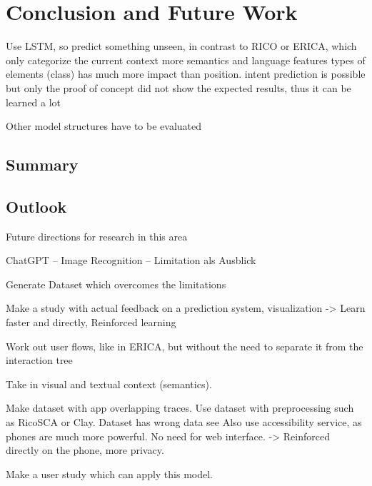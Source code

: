 \chapter{Conclusion and Future Work}
\label{sec:zusfas}

Use LSTM, so predict something unseen, in contrast to RICO or ERICA, which only categorize the current context
more semantics and language features
types of elements (class) has much more impact than position.
intent prediction is possible but only
the proof of concept did not show the expected results, thus it can be learned a lot

Other model structures have to be evaluated

\section*{Summary}
\section*{Outlook}

Future directions for research in this area

ChatGPT – Image Recognition – Limitation als Ausblick

Generate Dataset which overcomes the limitations

Make a study with actual feedback on a prediction system, visualization
-> Learn faster and directly, Reinforced learning

Work out user flows, like in ERICA, but without the need to separate it from the interaction tree

Take in visual and textual context (semantics).

Make dataset with app overlapping traces.
Use dataset with preprocessing such as RicoSCA or Clay. Dataset has wrong data see \cite{clay}
Also use accessibility service, as phones are much more powerful.
No need for web interface.
-> Reinforced directly on the phone, more privacy.

Make a user study which can apply this model.

